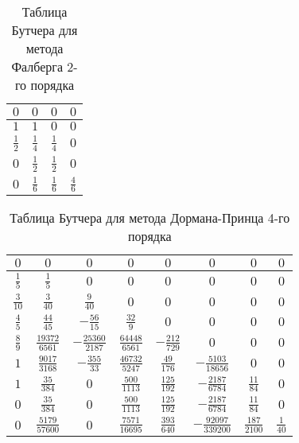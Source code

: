 \begin{table}
    \caption{Таблица Бутчера для метода Фалберга 2-го порядка}
    \begin{tabular}{|c|c|c|c|}
    \hline
    $0$ & $0$ & $0$ & $0$\\
    \hline
    $1$ & $1$ & $0$ & $0$\\
    \hline
    $\frac{1}{2}$ & $\frac{1}{4}$ & $\frac{1}{4}$ & $0$\\
    \hline
    $0$ & \cellcolor{lightgray} $\frac{1}{2}$ & \cellcolor{lightgray} $\frac{1}{2}$ & \cellcolor{lightgray} $0$\\
    \hline
    $0$ & \cellcolor{lightgray} $\frac{1}{6}$ & \cellcolor{lightgray} $\frac{1}{6}$ & \cellcolor{lightgray} $\frac{4}{6}$\\
    \hline
    \end{tabular}
    \label{tab:Falberg2}
\end{table}

\begin{table}    
    \caption{Таблица Бутчера для метода Дормана-Принца 4-го порядка}
    \begin{tabular}{|c|c|c|c|c|c|c|c|}
    \hline
    $0$ & $0$ & $0$ & $0$ & $0$ & $0$ & $0$ & $0$\\
    \hline
    $\frac{1}{5}$ & $\frac{1}{5}$ & $0$ & $0$ & $0$ & $0$ & $0$ & $0$\\
    \hline
    $\frac{3}{10}$ & $\frac{3}{40}$ & $\frac{9}{40}$ & $0$ & $0$ & $0$ & $0$ & $0$\\
    \hline
    $\frac{4}{5}$ & $\frac{44}{45}$ & $-\frac{56}{15}$ & $\frac{32}{9}$ & $0$ & $0$ & $0$ & $0$\\
    \hline
    $\frac{8}{9}$ & $\frac{19372}{6561}$ & $-\frac{25360}{2187}$ & $\frac{64448}{6561}$ & $-\frac{212}{729}$ & $0$ & $0$ & $0$\\
    \hline
    $1$ & $\frac{9017}{3168}$ & $-\frac{355}{33}$ & $\frac{46732}{5247}$ & $\frac{49}{176}$ & $-\frac{5103}{18656}$ & $0$ & $0$\\
    \hline
    $1$ & $\frac{35}{384}$ & $0$ & $\frac{500}{1113}$ & $\frac{125}{192}$ & $-\frac{2187}{6784}$ & $\frac{11}{84}$ & $0$\\
    \hline
    $0$ & \cellcolor{lightgray} $\frac{35}{384}$ & \cellcolor{lightgray} $0$ & \cellcolor{lightgray} $\frac{500}{1113}$ & \cellcolor{lightgray} $\frac{125}{192}$ & \cellcolor{lightgray} $-\frac{2187}{6784}$ & \cellcolor{lightgray} $\frac{11}{84}$ & \cellcolor{lightgray} $0$\\
    \hline
    $0$ & \cellcolor{lightgray} $\frac{5179}{57600}$ & \cellcolor{lightgray} $0$ & \cellcolor{lightgray} $\frac{7571}{16695}$ & \cellcolor{lightgray} $\frac{393}{640}$ & \cellcolor{lightgray} $-\frac{92097}{339200}$ & \cellcolor{lightgray} $\frac{187}{2100}$ & \cellcolor{lightgray} $\frac{1}{40}$\\
    \hline
    \end{tabular}
    \label{tab:DormanPrince4}
\end{table}


